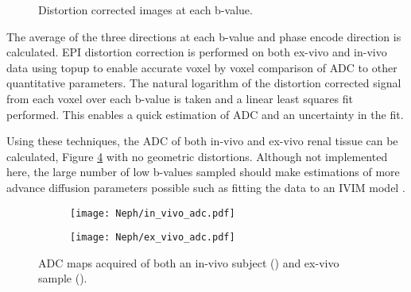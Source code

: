 \begin{figure}[H]
	\centering
	\caption{Distortion corrected images at each b-value.}
	\label{fig:ex_adc_raw_data}	
\end{figure}
%
%

The average of the three directions at each b-value and phase encode direction is calculated. \ac{EPI} distortion correction is performed on both ex-vivo and in-vivo data using topup to enable accurate voxel by voxel comparison of \ac{ADC} to other quantitative parameters. The natural logarithm of the distortion corrected signal from each voxel over each b-value is taken and a linear least squares fit performed. This enables a quick estimation of \ac{ADC} and an uncertainty in the fit. 

Using these techniques, the \ac{ADC} of both in-vivo and ex-vivo renal tissue can be calculated, Figure \ref{fig:ex_adc_maps} with no geometric distortions. Although not implemented here, the large number of low b-values sampled should make estimations of more advance diffusion parameters possible such as fitting the data to an \ac{IVIM} model \cite{le_bihan_separation_1988}.

\begin{figure}[H]
	\centering
	\begin{subfigure}[c]{0.47\textwidth}
		\centering
		\texttt{[image: Neph/in\_vivo\_adc.pdf]}%
		\caption{}
		\label{fig:ex_adc_maps_in_vivo}
	\end{subfigure}
	\hfill
	\begin{subfigure}[c]{0.47\textwidth}
		\centering
		\texttt{[image: Neph/ex\_vivo\_adc.pdf]}%
		\caption{}
		\label{fig:ex_adc_maps_ex_vivo}
	\end{subfigure}
	\caption{\ac{ADC} maps acquired of both an in-vivo subject () and ex-vivo sample ().}
	\label{fig:ex_adc_maps}
\end{figure}




